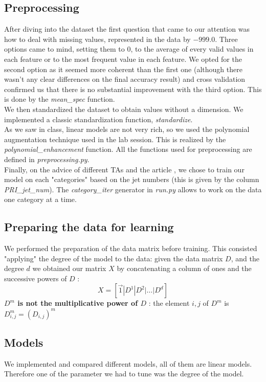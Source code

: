 \documentclass[10pt,conference,compsocconf]{IEEEtran}
\begin{document}
\subsection{Preprocessing}
After diving into the dataset the first question that came to our attention was how to deal with missing values, represented in the data by $-999.0$. Three options came to mind, setting them to $0$, to the average of every valid values in each feature or to the most frequent value in each feature. We opted for the second option as it seemed more coherent than the first one (although there wasn't any clear differences on the final accuracy result) and cross validation confirmed us that there is no substantial improvement with the third option. This is done by the \textit{mean\_spec} function.\\
We then standardized the dataset to obtain values without a dimension. We implemented a classic standardization function, \textit{standardize}.\\ As we saw in class, linear models are not very rich, so we used the polynomial augmentation technique used in the lab session. This is realized by the \textit{polynomial\_enhancement} function. All the functions used for preprocessing are defined in \textit{preprocessing.py}.\\
Finally, on the advice of different TAs and the article \cite{anderson04}, we chose to train our model on each "categories" based on the jet numbers (this is given by the column \textit{PRI\_jet\_num}). The \textit{category\_iter} generator in \textit{run.py} allows to work on the data one category at a time.

\subsection{Preparing the data for learning}
We performed the preparation of the data matrix before training. This consisted "applying" the degree of the model to the data: given the data matrix $D$, and the degree $d$ we obtained our matrix $X$ by concatenating a column of ones and the successive powers of $D$ : $$X = \left[\vec{1} | D^1 | D^2 | \dots | D^d\right]$$
\textbf{$D^m$ is not the multiplicative power of $D$ }: the element $i,j$ of $D^m$ is $D^m_{i,j}= (D_{i,j})^m$

\subsection{Models}
We implemented and compared different models, all of them are linear models. Therefore one of the parameter we had to tune was the degree of the model.
\end{document}
